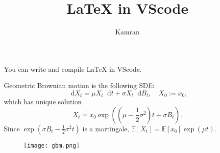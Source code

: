 \documentclass{article}
\title{LaTeX in VScode}
\author{Kamran}
\renewcommand\brack[1]{\left (#1\right)}
\newcommand\sbrack[1]{\left [ #1 \right ]}
\newcommand{\dd}{\mathop{}\!\mathrm{d}}
\newcommand{\bbE}{\mathbb{E}}
\newcommand\E[1]{\bbE\sbrack{#1}}
\begin{document}
    \maketitle
    
    You can write and compile LaTeX in VScode.

    Geometric Brownian motion is the following SDE:
    $$
    \dd X_t = \mu X_t \dd t + \sigma X_t \dd B_t, \quad X_0 := x_0,
    $$
    which has unique solution
    $$
    X_t = x_0 \exp \brack{\brack{\mu - \frac{1}{2}\sigma^2}t + \sigma B_t}.
    $$
    Since $\exp\brack{\sigma B_t - \frac{1}{2}\sigma^2 t}$ is a martingale, $\E{X_t} = \E{x_0}\exp(\mu t)$.

    \begin{figure}[!h]
        \centering
        \texttt{[image: gbm.png]}
        \label{fig:gbm}
    \end{figure}
\end{document}
